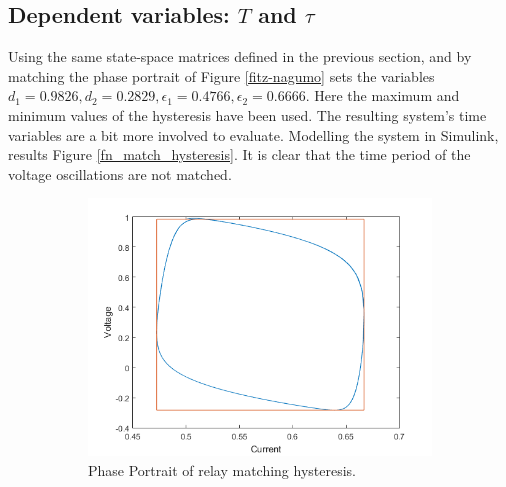 \documentclass[a4paper]{article}
\begin{document}
\subsection{Dependent variables: $ T $ and $ \tau $}

Using the same state-space matrices defined in the previous section, and by matching the phase portrait of Figure \ref{fitz-nagumo} sets the variables $d_1 = 0.9826, d_2 = 0.2829, \epsilon_1 = 0.4766, \epsilon_2 = 0.6666$. Here the maximum and minimum values of the hysteresis have been used. The resulting system's time variables are a bit more involved to evaluate. Modelling the system in Simulink, results Figure \ref{fn_match_hysteresis}. It is clear that the time period of the voltage oscillations are not matched. 

\begin{figure}[h!]
    \centering
    \begin{subfigure}[t]{0.49\textwidth}
        \includegraphics[width=\textwidth]{fitz_relay_match_hysteresis_phase_potrait}
        \caption{Phase Portrait of relay matching hysteresis.}
        \label{fn_match_hysteresis_pp}
    \end{subfigure}
    ~ %
    \begin{subfigure}[t]{0.49\textwidth}

\end{subfigure}
\end{figure}
\end{document}
